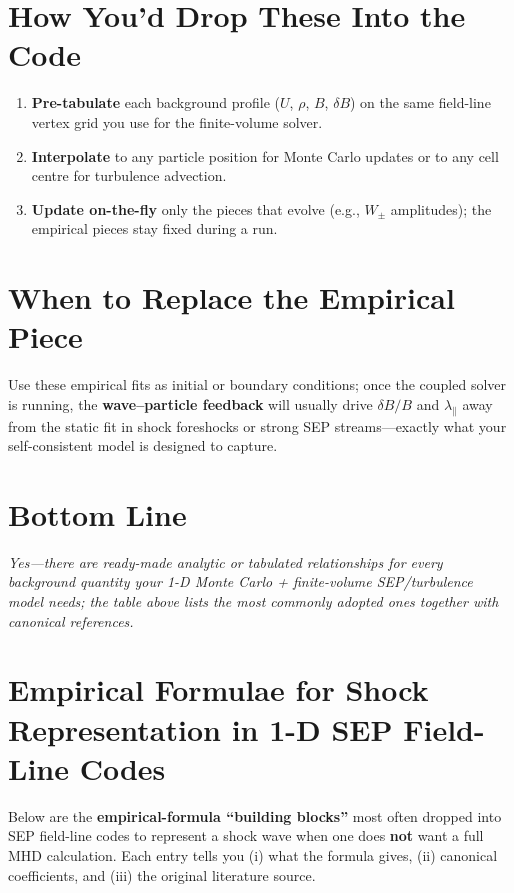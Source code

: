 \hrulefill

\section*{How You'd Drop These Into the Code}

\begin{enumerate}
    \item \textbf{Pre-tabulate} each background profile ($U$, $\rho$, $B$, $\delta B$) on the same field-line vertex grid you use for the finite-volume solver.
    \item \textbf{Interpolate} to any particle position for Monte Carlo updates or to any cell centre for turbulence advection.
    \item \textbf{Update on-the-fly} only the pieces that evolve (e.g., $W_\pm$ amplitudes); the empirical pieces stay fixed during a run.
\end{enumerate}

\section*{When to Replace the Empirical Piece}

Use these empirical fits as initial or boundary conditions; once the coupled solver is running, the \textbf{wave–particle feedback} will usually drive $\delta B/B$ and $\lambda_\parallel$ away from the static fit in shock foreshocks or strong SEP streams—exactly what your self-consistent model is designed to capture.

\hrulefill

\section*{Bottom Line}

\textit{Yes—there are ready-made analytic or tabulated relationships for every background quantity your 1-D Monte Carlo + finite-volume SEP/turbulence model needs; the table above lists the most commonly adopted ones together with canonical references.}

\section*{Empirical Formulae for Shock Representation in 1-D SEP Field-Line Codes}

Below are the \textbf{empirical-formula ``building blocks''} most often dropped into SEP field-line codes to represent a shock wave when one does \textbf{not} want a full MHD calculation. Each entry tells you (i) what the formula gives, (ii) canonical coefficients, and (iii) the original literature source.

